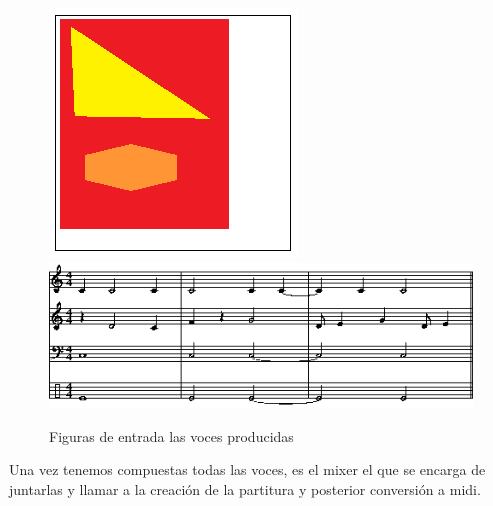 		\begin{figure}[htbp]
		\centering
		\hspace*{0.0in}
		\includegraphics[scale=1]{graphics/simpletest5.png}
		\includegraphics[scale=1]{graphics/simpletest5-partitura.png}
		\caption{Figuras de entrada las voces producidas}
		\label{fig:Figura1Mixer}
		\end{figure}

Una vez tenemos compuestas todas las voces, es el mixer el que se encarga de juntarlas y llamar a la creación de la partitura y posterior conversión a midi.
